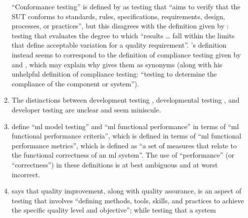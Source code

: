 \begin{enumerate}
          ``Conformance testing'' is defined by \citet[p.~5\=/7]{SWEBOK2024} as
          testing that ``aims to verify that the SUT conforms to standards,
          rules, specifications, requirements, design, processes, or practices'',
          but this disagrees with the definition given by \citet[p.~92]{IEEE2017}%
          : testing that evaluates the degree to which
          ``results \dots{} fall within the limits that define acceptable
          variation for a quality requirement''. \citeauthor{SWEBOK2024}'s
          definition instead seems to correspond to the definition of compliance
          testing given by \citetISTQB{} and
          \citet[p.~33]{Firesmith2015}, which may explain why
          \citet[p.~43]{Kam2008} gives them as synonyms (along with his
          unhelpful definition of compliance testing: ``testing to determine
          the compliance of the component or system'').
    \item %
          The distinctions between development testing \citep[p.~136]{IEEE2017},
          developmental testing \citep[p.~30]{Firesmith2015}, and developer
          testing \citep[p.~39;][p.~11]{Gerrard2000a} are unclear and seem
          miniscule.
    \item %
          \citetISTQB{} define
          ``\acf{ml} model testing'' and ``\acs{ml} functional performance''
          in terms of ``\acs{ml} functional performance criteria'',
          which is defined in terms of ``\acs{ml} functional performance
          metrics'', which is defined as ``a set of measures that relate to the
          functional correctness of an \acs{ml} system''. The use
          of ``performance'' (or ``correctness'') in these definitions is at
          best ambiguous and at worst incorrect.
    \item %
          \citet[p.~5\=/4]{SWEBOK2024} says that quality improvement,
          along with quality assurance, is an aspect of testing that involves
          ``defining methods, tools, skills, and practices to achieve the
          specific quality level and objective''; while testing that a system

\end{enumerate}
